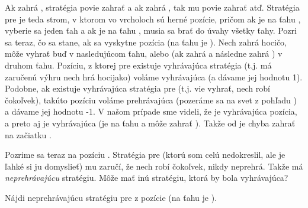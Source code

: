 Ak \noughtinl zahrá , stratégia povie \crossinl zahrať 
a ak \noughtinl zahrá , tak mu povie zahrať  atď.
Stratégia pre \crossinl je teda strom, v ktorom vo vrcholoch sú herné pozície, pričom 
ak je na ťahu \crossinl, vyberie sa jeden ťah a ak je na ťahu \noughtinl, musia sa brať
do úvahy všetky ťahy. Pozri sa teraz, čo sa stane, ak sa vyskytne pozícia 
(na ťahu je \noughtinl). Nech \noughtinl zahrá hocičo, \crossinl môže vyhrať buď v nasledujúcom ťahu,
alebo (ak \noughtinl zahrá  a následne \crossinl zahrá )
v druhom ťahu. Pozíciu, z ktorej pre \crossinl existuje vyhrávajúca stratégia (t.j. má zaručenú
výhru nech \noughtinl hrá hocijako) voláme vyhrávajúca (a dávame jej hodnotu 1). 
Podobne, ak existuje vyhrávajúca stratégia pre \noughtinl (t.j. \noughtinl vie vyhrať,
nech \crossinl robí čokoľvek), takúto pozíciu 
voláme prehrávajúca (pozeráme sa na svet z pohľadu \crossinl) a
dávame jej hodnotu -1. V našom prípade sme videli, že  je vyhrávajúca pozícia,
a preto aj  je vyhrávajúca (\crossinl je na ťahu a môže zahrať
). Takže od \noughtinl
je chyba zahrať na začiatku .


Pozrime sa teraz na pozíciu . Stratégia pre \crossinl (ktorú som celú 
nedokreslil, ale je ľahké si ju domyslieť) mu zaručí, že nech \noughtinl robí čokoľvek, 
\crossinl nikdy neprehrá. Takže \crossinl má {\em neprehrávajúcu} stratégiu. Môže
mať inú stratégiu, ktorá by bola vyhrávajúca?

\def\ulohaTarget{None}
\begin{uloha}
  Nájdi neprehrávajúcu stratégiu pre \noughtinl z pozície  
  (na ťahu je \crossinl).
\end{uloha}
\def\ulohaTarget{Dir}


